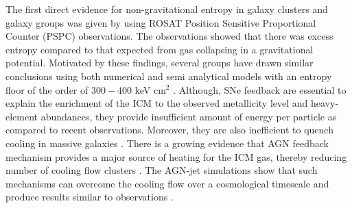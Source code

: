 \documentclass[a4paper,fleqn,usenatbib]{mnras}
\begin{document}
The first direct evidence for non-gravitational entropy in galaxy clusters and galaxy groups was given by \cite{David1996} using  ROSAT Position Sensitive Proportional Counter (PSPC) observations.
 The observations showed that there was excess entropy compared to that expected from gas collapsing in a gravitational potential.
Motivated by these findings, several groups have drawn similar conclusions using both numerical and semi analytical models  with an entropy floor of the order of $300-400$ keV cm$^2$ \citep{Ponman1999,Tozzi2001,Eckert2013a,Chaudhuri2012,Chaudhuri2013}.
Although, SNe feedback are essential to explain the enrichment of the ICM to the observed metallicity level and heavy-element abundances, they provide insufficient amount of energy per particle as compared 
to recent observations. Moreover, they are also inefficient to quench cooling in massive galaxies \citep{Springel2005}.  
There is a growing evidence that AGN feedback mechanism provides a major source of heating for the ICM gas, thereby reducing number of cooling flow clusters 
\citep{McNamara2007,Gaspari2011,Chaudhuri2012,Chaudhuri2013,Gaspari2014}. The  AGN-jet simulations show that such mechanisms can overcome the cooling flow over a cosmological timescale and produce results similar to 
observations \citep{Gaspari2012,Gaspari2014,Li2015}.
 
\end{document}
